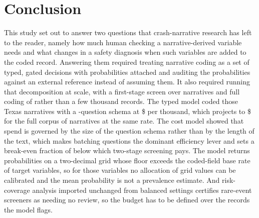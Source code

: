 \section{Conclusion}
\label{sec:conclusion}

This study set out to answer two questions that crash-narrative research has left to the
reader, namely how much human checking a narrative-derived variable needs and what changes in a
safety diagnosis when such variables are added to the coded record. Answering them required
treating narrative coding as a set of typed, gated decisions with probabilities attached and
auditing the probabilities against an external reference instead of assuming them. It also
required running that decomposition at scale, with a first-stage screen over \StageOneCoded{}
narratives and full coding of \NstageTwo{} rather than a few thousand records. The typed model
coded those \NstageTwo{} Texas narratives with a \NQuestions{}-question schema at
\$\CostPerThousand{} per thousand, which projects to \$\CostWholeCorpus{} for the full corpus
of \Ncorpus{} narratives at the same rate. The cost model showed that spend is governed by the
size of the question schema rather than by the length of the text, which makes batching
questions the dominant efficiency lever and sets a break-even fraction of \BreakEvenFraction{}
below which two-stage screening pays. The model returns probabilities
on a two-decimal grid whose floor exceeds the coded-field base rate of \NbelowFloor{} target
variables,
so for those variables no allocation of grid values can be calibrated and the mean
probability is not a prevalence estimate. And risk-coverage analysis imported unchanged from
balanced settings certifies rare-event screeners as needing no review, so the budget has to
be defined over the records the model flags.

